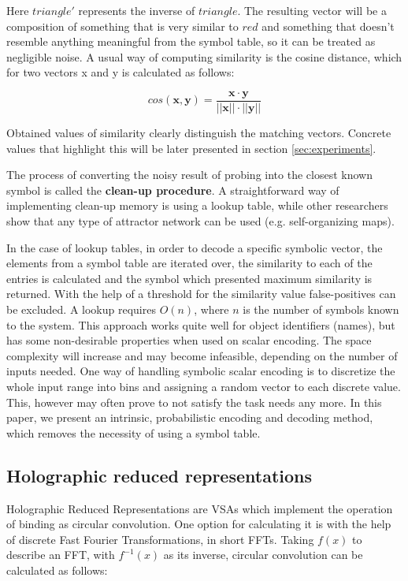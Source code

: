 \documentclass[journal]{journal}
\begin{document}
	Here $triangle'$ represents the inverse of $triangle$.
The resulting vector will be a composition of something that is very similar to $red$ and something that doesn't resemble anything meaningful from the symbol table, so it can be treated as negligible noise.	A usual way of computing similarity is the cosine distance, which for two vectors \pmb x and \pmb y is calculated as follows:
	
	\begin{equation}
cos(\pmb x, \pmb y) = \frac {\pmb x \cdot \pmb y}{||\pmb x|| \cdot ||\pmb y||}
	\end{equation} 
	
	Obtained values of similarity clearly distinguish the matching vectors. Concrete values that highlight this will be later presented in section \ref{sec:experiments}.	

	The process of converting the noisy result of probing into the closest known symbol is called the \textbf{clean-up procedure}.
A straightforward way of implementing clean-up memory is using a lookup table, while other researchers show that any type of attractor network can be used (e.g. self-organizing maps).

	In the case of lookup tables, in order to decode a specific symbolic vector, the elements from a symbol table are iterated over, the similarity to each of the entries is calculated and the symbol which presented maximum similarity is returned. With the help of a threshold for the similarity value false-positives can be excluded. A lookup requires $O(n)$, where $n$ is the number of symbols known to the system. This approach works quite well for object identifiers (names), but has some non-desirable properties when used on scalar encoding. The space complexity will increase and may become infeasible, depending on the number of inputs needed. One way of handling symbolic scalar encoding is to discretize the whole input range into bins and assigning a random vector to each discrete value. This, however may often prove to not satisfy the task needs any more.
In this paper, we present an intrinsic, probabilistic encoding and decoding
method, which removes the necessity of using a symbol table.

	\subsection{Holographic reduced representations}
	\label{sec:hrr}
	
	Holographic Reduced Representations are VSAs which implement the operation of binding as circular convolution. One option for calculating it is with the help of discrete Fast Fourier Transformations, in short FFTs. Taking $f(x)$ to describe an FFT, with $f^{-1}(x)$ as its inverse, circular convolution can be calculated as follows:
	
\end{document}
